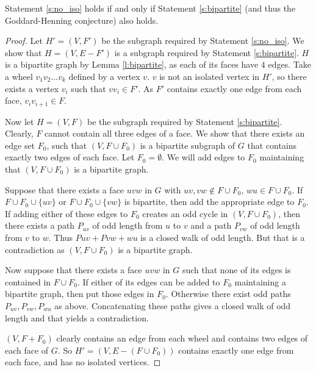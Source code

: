 \begin{claim}
  Statement \ref{s:no_iso} holds if and only if Statement \ref{s:bipartite} (and thus
  the Goddard-Henning conjecture) also holds.
\end{claim}
\begin{proof}
  Let $H' = (V, F')$ be the subgraph required by Statement \ref{s:no_iso}.
  We show that $H = (V, E - F')$ is a subgraph required by Statement \ref{s:bipartite}.
  $H$ is a bipartite graph by Lemma \ref{l:bipartite}, as each of its faces have $4$ edges.
  Take a wheel $v_1v_2\dots v_k$ defined by a vertex $v$. $v$ is not an isolated vertex in $H'$, so
  there exists a vertex $v_i$ such that $vv_i \in F'$. As $F'$ contains exactly one edge
  from each face, $v_iv_{i + 1} \in F$.

  \vspace{0.4cm}

  Now let $H = (V, F)$ be the subgraph required by Statement \ref{s:bipartite}.
  Clearly, $F$ cannot contain all three edges of a face.
  We show that there exists an edge set $F_0$, such that $(V, F \cup F_0)$ is a bipartite
  subgraph of $G$ that contains exactly two edges of each face. Let $F_0 = \emptyset$.
  We will add edges to $F_0$ maintaining that $(V, F \cup F_0)$ is a bipartite graph.

  Suppose that there exists a face $uvw$ in $G$ with $uv, vw \notin F \cup F_0$, $wu \in F \cup F_0$.
  If $F \cup F_0 \cup \{ uv \}$ or $F \cup F_0 \cup \{ vw \}$ is bipartite, then
  add the appropriate edge to $F_0$. If adding either of these edges to $F_0$ creates
  an odd cycle in $(V, F \cup F_0)$, then there exists a path $P_{uv}$ of odd
  length from $u$ to $v$ and a path $P_{vw}$ of odd length from $v$ to $w$. Thus $P{uv}
  + P{vw} + wu$ is a closed walk of odd length. But that is a contradiction as
  $(V, F \cup F_0)$ is a bipartite graph.

  Now suppose that there exists a face $uvw$ in $G$ such that none of its edges is
  contained in $F \cup F_0$. If either of its edges can be added to $F_0$ maintaining a
  bipartite graph, then put those edges in $F_0$. Otherwise there exist odd paths
  $P_{uv}, P_{vw}, P_{wu}$ as above. Concatenating these paths gives a closed walk
  of odd length and that yields a contradiction.

  $(V, F + F_0)$ clearly contains an edge from each wheel and contains two
  edges of each face of $G$. So $H' = (V, E - (F \cup F_0))$ contains exactly one edge
  from each face, and has no isolated vertices.
\end{proof}

